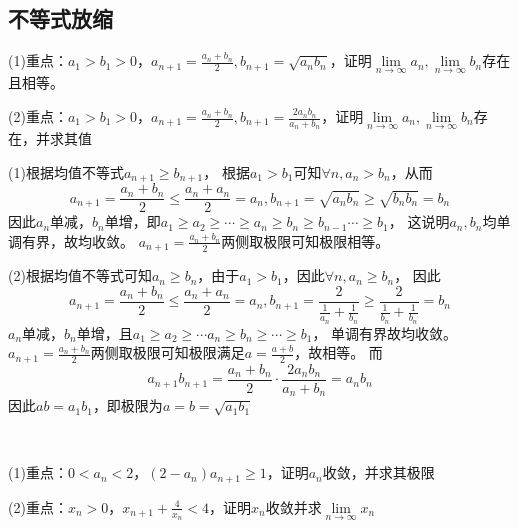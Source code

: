\subsection{不等式放缩}

\begin{exercise}
  (1)重点：$a_1 > b_1 > 0$，$a_{n+1} = \frac{a_n+ b_n}{2}, b_{n+1} = \sqrt{a_nb_n}$，证明$\lim \limits _{n \rightarrow \infty} a_n, \lim \limits _{n \rightarrow \infty} b_n$存在且相等。

  (2)重点：$a_1 > b_1 > 0$，$a_{n+1} = \frac{a_n + b_n}{2}, b_{n+1} = \frac{2a_nb_n}{a_n + b_n}$，证明$\lim \limits _{n \rightarrow \infty} a_n, \lim \limits _{n \rightarrow \infty} b_n$存在，并求其值
\end{exercise}

\begin{solution}
  (1)根据均值不等式$a_{n+1} \geq b_{n+1}$，
  根据$a_1 > b_1$可知$\forall n, a_n > b_n$，从而
  \begin{equation*}
    a_{n+1} = \frac{a_n + b_n}{2} \leq \frac{a_n + a_n}{2} = a_n, b_{n+1} = \sqrt{a_nb_n} \geq \sqrt{b_nb_n} = b_n
  \end{equation*}
  因此$a_n$单减，$b_n$单增，即$a_1 \geq a_2 \geq \cdots \geq a_n \geq b_n \geq b_{n-1} \cdots \geq b_1$，
  这说明$a_n,b_n$均单调有界，故均收敛。
  $a_{n+1} = \frac{a_n + b_n}{2}$两侧取极限可知极限相等。

  (2)根据均值不等式可知$a_n \geq b_n$，由于$a_1 > b_1$，因此$\forall n, a_n \geq b_n$，
  因此
  \begin{equation*}
    a_{n+1} = \frac{a_n + b_n}{2} \leq \frac{a_n + a_n}{2} = a_n, b_{n+1} = \frac{2}{\frac{1}{a_n} + \frac{1}{b_n}} \geq \frac{2}{\frac{1}{b_n} + \frac{1}{b_n}} = b_n
  \end{equation*}
  $a_n$单减，$b_n$单增，且$a_1 \geq a_2 \geq \cdots a_n \geq b_n \geq \cdots \geq b_1$，
  单调有界故均收敛。
  $a_{n+1} = \frac{a_n + b_n}{2}$两侧取极限可知极限满足$a = \frac{a+b}{2}$，故相等。
  而
  \begin{equation*}
    a_{n+1}b_{n+1} = \frac{a_n + b_n}{2} \cdot \frac{2a_nb_n}{a_n + b_n} = a_nb_n
  \end{equation*}
  因此$ab = a_1b_1$，即极限为$a = b = \sqrt{a_1b_1}$
\end{solution}

~

\begin{exercise}[前后项不等式放缩]
  (1)重点：$0 < a_n < 2$，$(2 - a_n)a_{n+1} \geq 1$，证明$a_n$收敛，并求其极限

  (2)重点：$x_n > 0$，$x_{n+1} + \frac{4}{x_n} < 4$，证明$x_n$收敛并求$\lim \limits _{n \rightarrow \infty} x_n$
\end{exercise}

